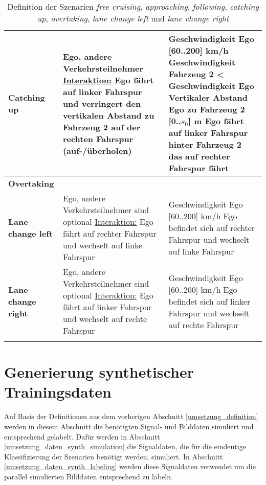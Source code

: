 \begin{longtable}[c]{p{2cm} p{5.5cm} p{6cm}}
\textbf{Catching up} & Ego, andere Verkehrsteilnehmer \newline \underline{Interaktion:} Ego fährt auf linker Fahrspur und verringert den vertikalen Abstand zu Fahrzeug 2 auf der rechten Fahrspur (auf-/überholen) & Geschwindigkeit Ego [60..200] km/h \newline Geschwindigkeit Fahrzeug 2 < Geschwindigkeit Ego \newline Vertikaler Abstand Ego zu Fahrzeug 2 [0..$s_0$] m \newline Ego fährt auf linker Fahrspur hinter Fahrzeug 2 das auf rechter Fahrspur fährt \\
\hline

\textbf{Overtaking} & & \\
\hline

\textbf{Lane change left} & Ego, andere Verkehrsteilnehmer sind optional \newline \underline{Interaktion:} Ego fährt auf rechter Fahrspur und wechselt auf linke Fahrspur & Geschwindigkeit Ego [60..200] km/h \newline Ego befindet sich auf rechter Fahrspur und wechselt auf linke Fahrspur \\
\hline

\textbf{Lane change right} & Ego, andere Verkehrsteilnehmer sind optional \newline \underline{Interaktion:} Ego fährt auf linker Fahrspur und wechselt auf rechte Fahrspur & Geschwindigkeit Ego [60..200] km/h \newline Ego befindet sich auf linker Fahrspur und wechselt auf rechte Fahrspur \\
\hline

\caption{Definition der Szenarien \textit{free cruising}, \textit{approaching}, \textit{following}, \textit{catching up}, \textit{overtaking}, \textit{lane change left} und \textit{lane change right}}
\label{tab_definition_szenarios}
\end{longtable}
\normalsize

\section{Generierung synthetischer Trainingsdaten}
\label{umsetzung_daten_synth}

Auf Basis der Definitionen aus dem vorherigen Abschnitt \ref{umsetzung_definition} werden in diesem Abschnitt die benötigten Signal- und Bilddaten simuliert und entsprechend gelabelt. Dafür werden in Abschnitt \ref{umsetzung_daten_synth_simulation} die Signaldaten, die für die eindeutige Klassifizierung der Szenarien benötigt werden, simuliert. In Abschnitt \ref{umsetzung_daten_synth_labeling} werden diese Signaldaten verwendet um die parallel simulierten Bilddaten entsprechend zu labeln.
 

